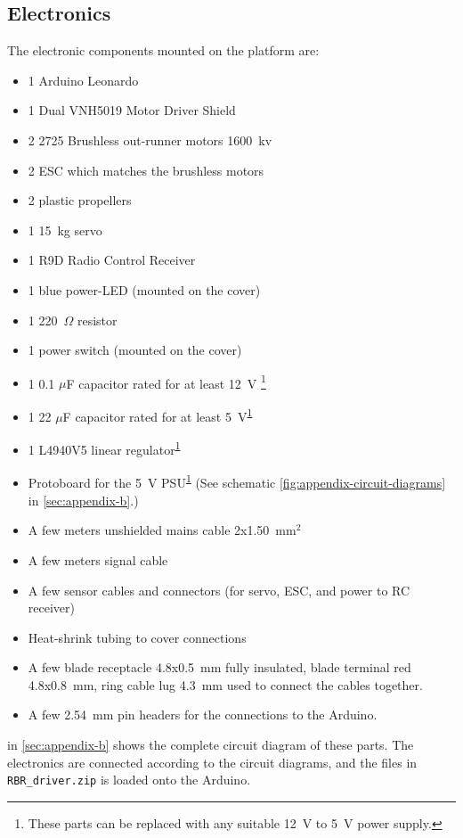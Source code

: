 \subsection{Electronics}\label{sec:appendix-electronics}
The electronic components mounted on the platform are:
\begin{itemize}
  \item 1 Arduino Leonardo
  \item 1 Dual VNH5019 Motor Driver Shield
  \item 2 2725 Brushless out-runner motors 1600~kv
  \item 2 ESC which matches the brushless motors
  \item 2 plastic propellers
  \item 1 15~kg servo
  \item 1 R9D Radio Control Receiver
  \item 1 blue power-LED (mounted on the cover)
  \item 1 220~$\Omega$ resistor
  \item 1 power switch (mounted on the cover)
  \item 1 0.1 $\mu$F capacitor rated for at least 12~V \footnote{\label{fotnot_app} These parts can be replaced with any suitable 12~V to 5~V power supply.}
  \item 1 22 $\mu$F capacitor rated for at least 5~V\textsuperscript{\ref{fotnot_app}}
  \item 1 L4940V5 linear regulator\textsuperscript{\ref{fotnot_app}}
  \item Protoboard for the 5~V PSU\textsuperscript{\ref{fotnot_app}} (See schematic \cref{fig:appendix-circuit-diagrams} in \cref{sec:appendix-b}.)
  \item A few meters unshielded mains cable 2x1.50~mm$^2$
  \item A few meters signal cable
  \item A few sensor cables and connectors (for servo, ESC, and power to RC receiver)
  \item Heat-shrink tubing to cover connections
  \item A few blade receptacle 4.8x0.5~mm fully insulated, blade terminal red
    4.8x0.8~mm, ring cable lug 4.3~mm used to connect the cables together.
  \item A few 2.54~mm pin headers for the connections to the Arduino.
\end{itemize}
  in \cref{sec:appendix-b} shows the complete circuit diagram of these parts. The electronics are connected according to the circuit diagrams, and the files in \texttt{RBR\_driver.zip} is loaded onto the Arduino.

